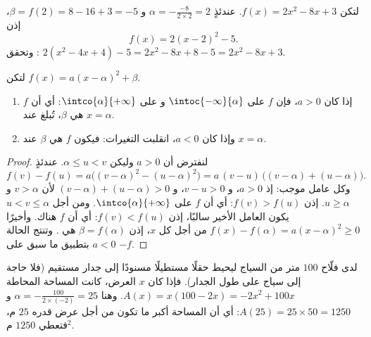 \begin{example}\label{ex:g11:quad:canonical}
لتكن $f(x) = 2x^2 - 8x + 3$. عندئذٍ $\alpha = -\frac{-8}{2 \times 2} = 2$ و
$\beta = f(2) = 8 - 16 + 3 = -5$، إذن
\[
f(x) = 2(x - 2)^2 - 5 .
\]
وتحقق : $2(x^2 - 4x + 4) - 5 = 2x^2 - 8x + 8 - 5 =
2x^2 - 8x + 3$.
\end{example}

\begin{proposition}\label{prop:g11:quad:variations}
لتكن $f(x) = a(x-\alpha)^2 + \beta$.
\begin{enumerate}
  \item إذا كان $a > 0$، فإن $f$  على $\intoc{-\infty}{\alpha}$ و
         على $\intco{\alpha}{+\infty}$: أي أن  $f$ \emph{}
        هي $\beta$، تُبلغ عند $x = \alpha$.
  \item وإذا كان $a < 0$، انقلبت التغيرات: فيكون  $f$ \emph{}
        هي $\beta$ عند $x = \alpha$.
\end{enumerate}
\end{proposition}

\begin{proof}
لنفترض أن $a > 0$ وليكن $\alpha \leq u < v$. عندئذٍ
\[
f(v) - f(u) = a\bigl((v-\alpha)^2 - (u-\alpha)^2\bigr)
= a\,(v - u)\,\bigl((v-\alpha) + (u-\alpha)\bigr).
\]
وكل عامل موجب: إذ $a > 0$، و $v - u > 0$، و
$(v-\alpha) + (u-\alpha) > 0$ لأن $v > \alpha$ و $u \geq \alpha$. إذن
$f(v) > f(u)$: أي أن $f$  على $\intco{\alpha}{+\infty}$. ومن أجل
$u < v \leq \alpha$ يكون العامل الأخير سالبًا، إذن $f(v) < f(u)$: أي أن $f$
 هناك. وأخيرًا $f(x) - f(\alpha) = a(x-\alpha)^2 \geq 0$ من أجل كل
$x$، إذن $\beta = f(\alpha)$ هي . وتنتج الحالة $a < 0$
بتطبيق ما سبق على $-f$.
\end{proof}

\begin{example}
لدى فلّاح $100$ متر من السياج ليحيط حقلًا مستطيلًا مسنودًا إلى
جدار مستقيم (فلا حاجة إلى سياج على طول الجدار). فإذا كان $x$ العرض،
كانت المساحة المحاطة $A(x) = x(100 - 2x) = -2x^2 + 100x$. وهنا $\alpha =
-\frac{100}{2\times(-2)} = 25$ و $A(25) = 25 \times 50 = 1250$: أي أن المساحة
أكبر ما تكون من أجل عرض قدره $25$ م، فتعطي $1250$ م$^2$.
\end{example}

